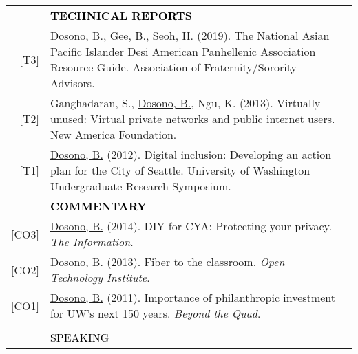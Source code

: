 \documentclass[11pt]{article}
\begin{document}
{{\begin{longtable}{Rp{0.75in}p{5.0in}}
& \textcolor{black}{\uppercase{\textbf{Technical Reports}}}\\


\footnotesize{[T3]} & \href{https://cdn.ymaws.com/www.afa1976.org/resource/resmgr/guides/afa-2019-resourceguide-napa-.pdf}{Dosono, B.}, Gee, B., Seoh, H. (2019). The National Asian Pacific Islander Desi American Panhellenic Association Resource Guide. Association of Fraternity/Sorority Advisors.\\

\footnotesize{[T2]} & Ganghadaran, S., \href{https://www.newamerica.org/oti/policy-papers/virtually-unused/}{Dosono, B.}, Ngu, K. (2013). Virtually unused: Virtual private networks and public internet users. New America Foundation.\\

\footnotesize{[T1]} & \href{https://expo.uw.edu/expo/apply/238/proceedings/offering_session?id=431}{Dosono, B.} (2012). Digital inclusion: Developing an action plan for the City of Seattle. University of Washington Undergraduate Research Symposium.\\

& \textcolor{black}{\uppercase{\textbf{Commentary}}}\\
\footnotesize{[CO3]} & \href{https://theinformation.ischool.uw.edu/wp/2014/04/diy-for-cya-protecting-your-privacy/}{Dosono, B.} (2014). DIY for CYA: Protecting your privacy. \textit{The Information}.\\

\footnotesize{[CO2]} & \href{https://www.newamerica.org/oti/blog/fiber-to-the-classroom/}{Dosono, B.} (2013). Fiber to the classroom. \textit{Open Technology Institute}.\\

\footnotesize{[CO1]} & \href{https://uwartsci.wordpress.com/2011/11/25/importance-of-philanthropic-investment-for-the-next-150/}{Dosono, B.} (2011). 
Importance of philanthropic investment for UW's next 150 years. \textit{Beyond the Quad}.\\
\\

\sout{\hfill} 
& \par \Large \textcolor{black}{\uppercase{Speaking\hspace{6pt} \sout{\hfill}}}\\


\end{longtable}}}
\end{document}
